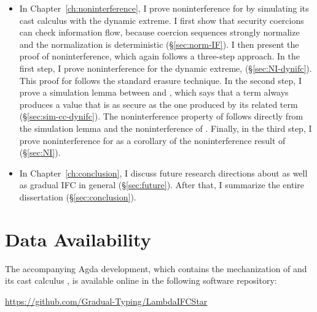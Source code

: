 {\begin{itemize}
    between more and less precise security coercion sequences
    (\S\ref{sec:sim-cexpr}). Second, I prove another simulation lemma, between
    \CC terms of different precision (\S\ref{sec:simulation}). Finally, I prove
    the gradual guarantee of \Surface by using the simulation lemma of \CC
    (\S\ref{sec:gg}).
  \item In Chapter~\ref{ch:noninterference}, I prove noninterference for
    \Surface by simulating its cast calculus with the dynamic extreme. I first
    show that security coercions can check information flow, because coercion
    sequences strongly normalize and the normalization is deterministic
    (\S\ref{sec:norm-IF}). I then present the proof of noninterference, which
    again follows a three-step approach. In the first step, I prove
    noninterference for the dynamic extreme, \DynIFC (\S\ref{sec:NI-dynifc}).
    This proof for \DynIFC follows the standard erasure technique. In the second
    step, I prove a simulation lemma between \CC and \DynIFC, which says that a
    \CC term always produces a value that is as secure as the one produced by
    its related \DynIFC term (\S\ref{sec:sim-cc-dynifc}). The noninterference
    property of \CC follows directly from the simulation lemma and the
    noninterference of \DynIFC. Finally, in the third step, I prove
    noninterference for \Surface as a corollary of the noninterference result of
    \CC (\S\ref{sec:NI}).
  \item In Chapter~\ref{ch:conclusion}, I discuss future research directions
    about \Surface as well as gradual IFC in general (\S\ref{sec:future}). After
    that, I summarize the entire dissertation (\S\ref{sec:conclusion}).
\end{itemize}

\section{Data Availability}
\label{sec:code-repo}

The accompanying Agda development, which contains the mechanization of \Surface and its
cast calculus \CC, is available online in the following software repository:
\begin{center}
  \large
  \url{https://github.com/Gradual-Typing/LambdaIFCStar}
\end{center}
}%
